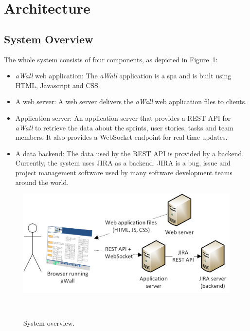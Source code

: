 \documentclass{sigchi}
\begin{document}
\section{Architecture}

\subsection{System Overview}

The whole system consists of four components, as depicted in Figure~\ref{fig:systemoverview}:
\begin{itemize}
	\item \textit{aWall} web application: The \textit{aWall} application is a \gls{spa} and is built using HTML, Javascript and CSS.
	
	\item A web server: A web server delivers the \textit{aWall} web application files to clients.
	
	\item Application server: An application server that provides a REST API for \textit{aWall} to retrieve the data about the sprints, user stories, tasks and team members.
	It also provides a WebSocket endpoint for real-time updates.
	
	\item A data backend: The data used by the REST API is provided by a backend. 
	Currently, the system uses JIRA \cite{jira} as a backend. JIRA is a bug, issue and project management software used by many software development teams around the world.
\end{itemize}

\begin{figure}[h]
	\centering
	\includegraphics[width=\columnwidth]{figures/systemoverview}
	\caption{System overview.}~\label{fig:systemoverview}
\end{figure}
\end{document}
